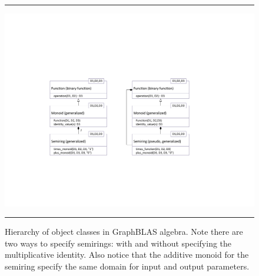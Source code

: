 \begin{figure}[htb]
    \hrule
    \begin{center}
        \includegraphics[width=1.0\linewidth,trim=1.5in 2in 1.5in 2in]{Algebra_Hierarchy.pdf}
    \end{center}
    \caption{Hierarchy of object classes in GraphBLAS algebra. Note there are 
    two ways to specify semirings: with and without specifying the
    multiplicative identity.  Also notice that the additive monoid for the
    semiring specify the same domain for input and output parameters.}
    \label{Fig:AlgebraHierarchy}
    \hrule
\end{figure}

